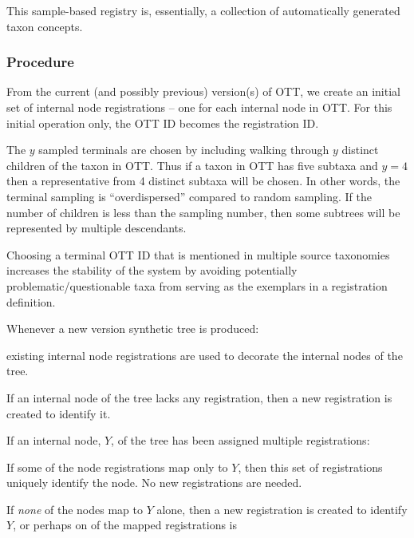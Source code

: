 \documentclass[11pt]{article}
\begin{document}
This sample-based registry is, essentially, a collection of automatically
  generated taxon concepts.

\subsubsection{Procedure}
\begin{compactenum}
  \item From the current (and possibly previous) version(s) of OTT,
  we create an initial set of internal node registrations -- one for each internal node in OTT.
  For this initial operation only, the OTT ID becomes the registration ID.
  \begin{compactitem}
    \item The $y$ sampled terminals are chosen by including walking through $y$ distinct
    children of the taxon in OTT.
    Thus if a taxon in OTT has five subtaxa and $y=4$ then a representative from
    4 distinct subtaxa will be chosen.
    In other words, the terminal sampling is ``overdispersed'' compared to random sampling.
    If the number of children is less than the sampling number, then some subtrees will be represented by multiple descendants.
    \item Choosing a terminal OTT ID that is mentioned in multiple source taxonomies increases
    the stability of the system by avoiding potentially problematic/questionable
    taxa from serving as the exemplars in a registration definition.
  \end{compactitem}
  \item Whenever a new version synthetic tree is produced:
    \begin{compactenum}
      \item existing internal node registrations are used to decorate the
      internal nodes of the tree.
      \item If an internal node of the tree lacks any registration, then a new registration is
      created to identify it.
      \item If an internal node, $Y$, of the tree has been assigned multiple registrations:
      \begin{compactenum}
        \item If some of the node registrations map only to $Y$, then this set
          of registrations uniquely identify the node. No new registrations are
          needed.
        \item If {\em none} of the nodes map to $Y$ alone, then a new
        registration is created to identify $Y$, or perhaps on of the mapped registrations is 

\end{compactenum}
\end{compactenum}
\end{compactenum}
\end{document}
